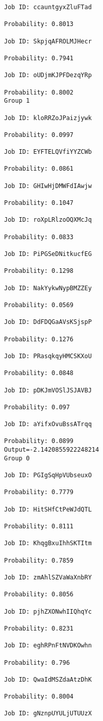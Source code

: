 \documentclass[11pt]{article}
\begin{document}
\begin{Verbatim}[commandchars=\\\{\}]
Job ID: ccauntgyxZluFTad

Probability: 0.8013

Job ID: SkpjqAFROLMJHecr

Probability: 0.7941

Job ID: oUDjmKJPFDezqYRp

Probability: 0.8002
Group 1

Job ID: kloRRZoJPaizjywk

Probability: 0.0997

Job ID: EYFTELQVfiYYZCWb

Probability: 0.0861

Job ID: GHIwHjDMWFdIAwjw

Probability: 0.1047

Job ID: roXpLRlzoOQXMcJq

Probability: 0.0833

Job ID: PiPGSeDNitkucfEG

Probability: 0.1298

Job ID: NakYykwNypBMZZEy

Probability: 0.0569

Job ID: DdFDQGaAVsKSjspP

Probability: 0.1276

Job ID: PRasqkqyHMCSKXoU

Probability: 0.0848

Job ID: pDKJmVOSlJSJAVBJ

Probability: 0.097

Job ID: aYifxOvuBssATrqq

Probability: 0.0899
Output=-2.1420855922248214
Group 0

Job ID: PGIgSqHpVUbseuxO

Probability: 0.7779

Job ID: HitSHfCtPeWJdQTL

Probability: 0.8111

Job ID: KhqgBxuIhhSKTItm

Probability: 0.7859

Job ID: zmAhlSZVaWaXnbRY

Probability: 0.8056

Job ID: pjhZXONwhIIQhqYc

Probability: 0.8231

Job ID: eghRPnFtNVDKOwhn

Probability: 0.796

Job ID: QwaIdMSZdaAtzDhK

Probability: 0.8004

Job ID: gNznpUYULjUTUUzX


\end{Verbatim}
\end{document}

